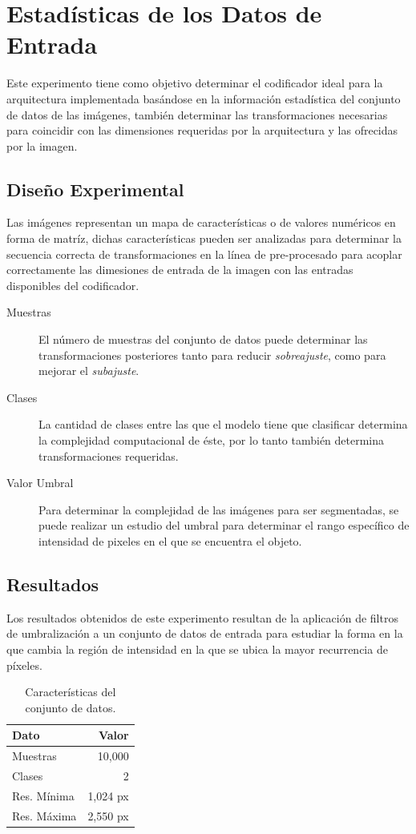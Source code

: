 \section{Estadísticas de los Datos de Entrada} 
Este experimento tiene como objetivo determinar el codificador ideal para la arquitectura implementada basándose en la información estadística del conjunto de datos de las imágenes, también determinar las transformaciones necesarias para coincidir con las dimensiones requeridas por la arquitectura y las ofrecidas por la imagen.

\subsection{Diseño Experimental}
Las imágenes representan un mapa de características o de valores numéricos en forma de matríz, dichas características pueden ser analizadas para determinar la secuencia correcta de transformaciones en la línea de pre-procesado para acoplar correctamente las dimesiones de entrada de la imagen con las entradas disponibles del codificador.
\begin{description}
    \item[Muestras] El número de muestras del conjunto de datos puede determinar las transformaciones posteriores tanto para reducir \emph{sobreajuste}, como para mejorar el \emph{subajuste}.
    \item[Clases] La cantidad de clases entre las que el modelo tiene que clasificar determina la complejidad computacional de éste, por lo tanto también determina transformaciones requeridas.
    \item[Valor Umbral] Para determinar la complejidad de las imágenes para ser segmentadas, se puede realizar un estudio del umbral para determinar el rango específico de intensidad de pixeles en el que se encuentra el objeto.
\end{description}

\subsection{Resultados}
Los resultados obtenidos de este experimento resultan de la aplicación de filtros de umbralización a un conjunto de datos de entrada para estudiar la forma en la que cambia la región de intensidad en la que se ubica la mayor recurrencia de píxeles.

\begin{table}[b]
    \centering
    \caption{Características del conjunto de datos.}
    \begin{tabular}{|l| r|}
        \hline
        \bf{Dato} & \bf{Valor} \\
        \hline
        Muestras & 10,000 \\
        \hline
        Clases & 2 \\
        \hline
        Res. Mínima & 1,024 px \\
        \hline
        Res. Máxima & 2,550 px \\
        \hline
    \end{tabular}
\end{table}

